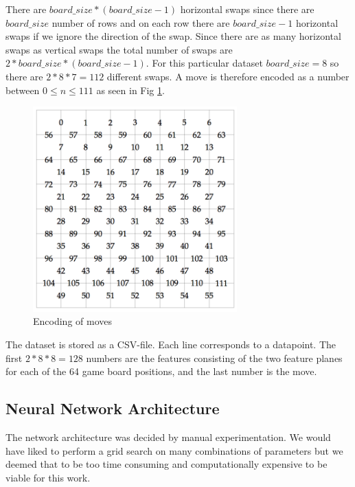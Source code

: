 \documentclass{kththesis}
\begin{document}
There are $board\_size * (board\_size-1)$ horizontal swaps since there are $board\_size$ number of rows and on each row there are $board\_size-1$ horizontal swaps if we ignore the direction of the swap. Since there are as many horizontal swaps as vertical swaps the total number of swaps are $2*board\_size*(board\_size-1)$. For this particular dataset $board\_size=8$ so there are $2*8*7=112$ different swaps. A move is therefore encoded as a number between $0\leq n \leq 111$ as seen in Fig \ref{fig:simple_move_encoding}. 

\begin{figure}[]
\centering
\includegraphics[width=0.7\textwidth]{images/encoding_small_moves.png}
\caption{Encoding of moves}
\label{fig:simple_move_encoding}
\end{figure}

The dataset is stored as a CSV-file. Each line corresponds to a datapoint. The first $2*8*8=128$ numbers are the features consisting of the two feature planes for each of the 64 game board positions, and the last number is the move.

\subsection{Neural Network Architecture}
The network architecture was decided by manual experimentation. We would have liked to perform a grid search on many combinations of parameters but we deemed that to be too time consuming and computationally expensive to be viable for this work. \\
\end{document}
